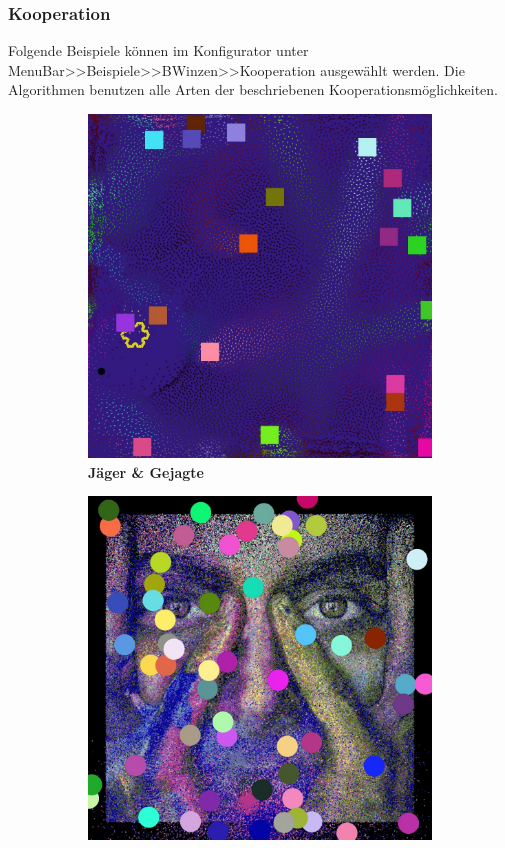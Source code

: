 \documentclass[../mciAusarbeitung.tex]{subfiles}
\begin{document}
\subsubsection{Kooperation}
	Folgende Beispiele können im Konfigurator unter MenuBar>>Beispiele>>BWinzen>>Kooperation ausgewählt werden. Die Algorithmen benutzen alle Arten der beschriebenen Kooperationsmöglichkeiten.
	\begin{figure}[H]
		\begin{subfigure}{0.5\linewidth}
 		\includegraphics[width=0.95\linewidth]{"img/coop1.jpg"}
		\caption[Jäger \& Gejagte]{\textbf{Jäger \& Gejagte}}  
		 \end{subfigure}
		\begin{subfigure}{0.5\linewidth}
 		\includegraphics[width=0.95\linewidth]{"img/coop2.jpg"}

\end{subfigure}
\end{figure}
\end{document}
